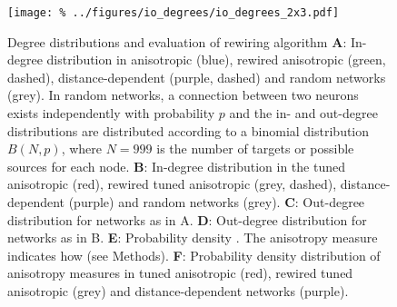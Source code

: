 

\begin{figure}[h]
  \texttt{[image: \%
    ../figures/io\_degrees/io\_degrees\_2x3.pdf]} %
  \caption{Degree distributions and evaluation of rewiring algorithm %
    \textbf{A}: In-degree distribution in anisotropic (blue), rewired
    anisotropic (green, dashed), distance-dependent (purple, dashed)
    and random networks (grey). In random networks, a connection between
    two neurons exists independently with probability $p$ and the in- and
    out-degree distributions are distributed according to a binomial
    distribution $B(N,p)$, where $N=999$ is the number of targets or
    possible sources for each node. %
    \textbf{B}: In-degree distribution in the tuned anisotropic (red),
    rewired tuned anisotropic (grey, dashed), distance-dependent
    (purple) and random networks (grey). %
    \textbf{C}: Out-degree distribution for networks as in A. %
    \textbf{D}: Out-degree distribution for networks as in B. %
    \textbf{E}: Probability density . The anisotropy measure indicates
    how (see Methods). %
    \textbf{F}: Probability density distribution of anisotropy
    measures in tuned anisotropic (red), rewired tuned anisotropic
    (grey) and distance-dependent networks (purple).}
\label{fig:io_deg}
\end{figure}


